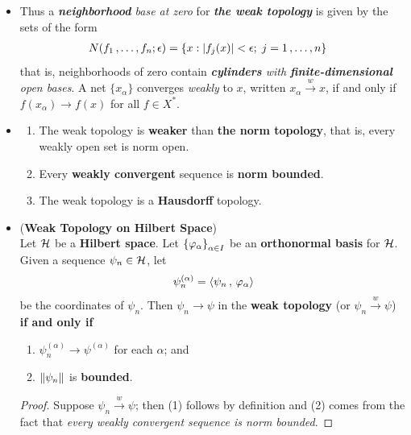 \documentclass[11pt]{article}
\begin{document}
\begin{itemize}
\item \begin{remark}
Thus a \emph{\textbf{neighborhood} base at zero} for \emph{\textbf{the weak topology}} is given by the sets
of the form
\begin{align*}
N(f_1 \,{,}\ldots{,}\, f_n; \epsilon) &= \left\{x: \left\lvert f_{j}(x) \right\rvert <\epsilon; \; j= 1 \,{,}\ldots{,}\, n\right\}
\end{align*}
that is, neighborhoods of zero contain \emph{\textbf{cylinders} with \textbf{finite-dimensional} open bases}. A net $\{x_{\alpha}\}$ converges \emph{weakly} to $x$, written $x_\alpha \stackrel{w}{\rightarrow} x$, if and only if $f(x_{\alpha}) \rightarrow f(x)$ for all $f \in X^{*}$.
\end{remark}



\item \begin{proposition} \citep{reed1980methods}
\begin{enumerate}
\item The weak topology is \textbf{weaker} than \textbf{the norm topology}, that is, every weakly open set is norm open.
\item Every \textbf{weakly convergent} sequence is \textbf{norm bounded}.
\item The weak topology is a \textbf{Hausdorff} topology.
\end{enumerate}
\end{proposition}


\item \begin{proposition} (\textbf{Weak Topology on Hilbert Space}) \citep{reed1980methods}\\
Let ${\mathcal H}$ be a \textbf{Hilbert space}. Let $\left\{\varphi_{\alpha}\right\}_{\alpha \in I}$ be an \textbf{orthonormal basis} for ${\mathcal H}$. Given a sequence $\psi_{n} \in {\mathcal H}$, let 
\begin{align*}
\psi_{n}^{(\alpha)}= \left\langle \psi_n\,,\, \varphi_{\alpha} \right\rangle
\end{align*}
be the coordinates of $\psi_n$. Then $\psi_n \rightarrow \psi$  in the \textbf{weak topology} (or  $\psi_n \stackrel{w}{\rightarrow} \psi$) \textbf{if and only if}
\begin{enumerate}
\item $\psi_{n}^{(\alpha)} \rightarrow \psi^{(\alpha)}$ for each $\alpha$; and
\item $\left\|\psi_n\right\|_{}$ is \textbf{bounded}.
\end{enumerate}
\end{proposition}
\begin{proof}
Suppose $\psi_n \stackrel{w}{\rightarrow} \psi$; then (1) follows by  definition and (2) comes from the fact that \emph{every weakly convergent sequence is norm bounded}. 


\end{proof}
\end{itemize}
\end{document}
